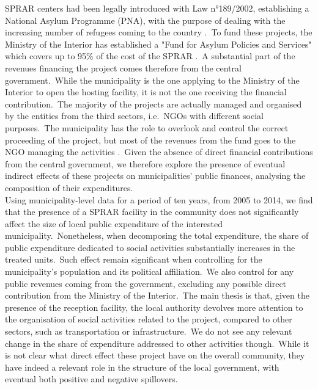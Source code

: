 \documentclass[authoryear,preprint,review,12pt]{elsarticle}
\begin{document}
\noindent
SPRAR centers had been legally introduced with Law n°189/2002, establishing a National Asylum Programme (PNA), with the purpose of dealing with the increasing number of refugees coming to the country \citep{cittalia2022}.\ To fund these projects, the Ministry of the Interior has established a "Fund for Asylum Policies and Services" which covers up to 95\% of the cost of the SPRAR \citep{ricardguay2019}.\ A substantial part of the revenues financing the project comes therefore from the central government.\ While the municipality is the one applying to the Ministry of the Interior to open the hosting facility, it is not the one receiving the financial contribution.\ The majority of the projects are actually managed and organised by the entities from the third sectors, i.e.\ NGOs with different social purposes.\ The municipality has the role to overlook and control the correct proceeding of the project, but most of the revenues from the fund goes to the NGO managing the activities \citep{ricardguay2019}.\ Given the absence of direct financial contributions from the central government, we therefore explore the presence of eventual indirect effects of these projects on municipalities' public finances, analysing the composition of their expenditures.\\ 

\noindent
Using municipality-level data for a period of ten years, from 2005 to 2014, we find that the presence of a SPRAR facility in the community does not significantly affect the size of local public expenditure of the interested municipality.\ Nonetheless, when decomposing the total expenditure, the share of public expenditure dedicated to social activities substantially increases in the treated units.\ Such effect remain significant when controlling for the municipality's population and its political affiliation.\ We also control for any public revenues coming from the government, excluding any possible direct contribution from the Ministry of the Interior.\ The main thesis is that, given the presence of the reception facility, the local authority devolves more attention to the organisation of social activities related to the project, compared to other sectors, such as transportation or infrastructure.\ We do not see any relevant change in the share of expenditure addressed to other activities though.\ While it is not clear what direct effect these project have on the overall community, they have indeed a relevant role in the structure of the local government, with eventual both positive and negative spillovers.\\ 
\end{document}
